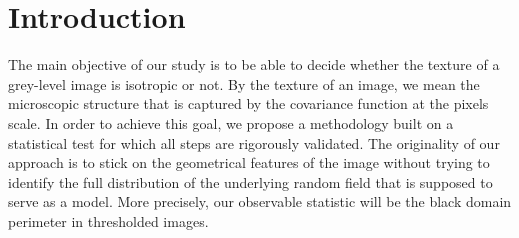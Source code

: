 \documentclass[12pt]{article}
\theoremstyle{Theorem}
\theoremstyle{definition}
\begin{document}
\section{Introduction}
The main objective of our study is to be able to decide whether the texture of a grey-level image is isotropic or not. By the texture of an image, we mean the microscopic structure that is captured by the covariance function at the pixels scale. In order to achieve this goal, we propose a methodology built on a statistical test for which all steps are rigorously validated. The originality of our approach is to stick on the geometrical features of the image without trying to identify the full distribution of the underlying random field that is supposed to serve as a model. More precisely, our observable statistic will be the black domain perimeter in thresholded images.
\end{document}
